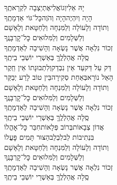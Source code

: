 
\shabbos\\
\yekumpurkans

\begin{sometimes}
\negline
\begin{narrow}
\\
יָהּ אֵלִי\hfill וְגוֹאֲלִי\hfill אֶתְיַצְבָה לִקְרָאתֶֽךָ\\
הָיָה וְיִהְיֶה\hfill הָיָה וְהֹוֶה\hfill כׇּל־גּוֹי אַדְמָתֶֽךָ\\
וְתוֹדָה וְלָעוֹלָה וְלַמִּנְחָה וְלַחַטָּאת וְלָאָשָׁם \\
וְלַשְּׁלָמִים וְלַמִּלוּאִים כׇּל־קׇרְבָּנֶֽךָ\\
זְכוֹר נִלְאָה אֲשֶׁר נָשְׂאָה וְהָשִׁיבָה לְאַדְמָתֶֽךָ\\
סֶֽלָה אֲהַלְלֶֽךָּ בְּאַשְׁרֵי יוֹשְׁבֵי בֵיתֶֽךָ\\
דַּק עַל דַּק\hfill עַד אֵין נִבְדַק\hfill וְלִתְבוּנָתוֹ אֵין חֵֽקֶר\\
הָאֵל נוֹרָא\hfill בְּאַחַת סְקִירָה\hfill בֵּין טוֹב לָרַע יְבַקֵּר\\
וְתוֹדָה וְלָעוֹלָה וְלַמִּנְחָה וְלַחַטָּאת וְלָאָשָׁם \\
וְלַשְּׁלָמִים וְלַמִּלוּאִים כׇּל־קׇרְבָּנֶֽךָ\\
זְכוֹר נִלְאָה אֲשֶׁר נָשְׂאָה וְהָשִׁיבָה לְאַדְמָתֶֽךָ\\
סֶֽלָה אֲהַלְלֶֽךָּ בְּאַשְׁרֵי יוֹשְׁבֵי בֵיתֶֽךָ\\
אֲדוֹן צְבָאוֹת\hfill בְּרוֹב פְּלָאוֹת\hfill חִבֵּר כׇּל־אׇהֳלוֹ\\
בִּנְתִיבוֹת לֵב\hfill לִבְלֵב\hfill הַצּוּר תָּמִים פׇּעֳלוֹ\\
וְתוֹדָה וְלָעוֹלָה וְלַמִּנְחָה וְלַחַטָּאת וְלָאָשָׁם \\
וְלַשְּׁלָמִים וְלַמִּלוּאִים כׇּל־קׇרְבָּנֶֽךָ\\
זְכוֹר נִלְאָה אֲשֶׁר נָשְׂאָה וְהָשִׁיבָה לְאַדְמָתֶֽךָ\\
סֶֽלָה אֲהַלְלֶֽךָּ בְּאַשְׁרֵי יוֹשְׁבֵי בֵיתֶֽךָ
\end{narrow}

\end{sometimes}

\sepline

\ashrei

\yehalelu

